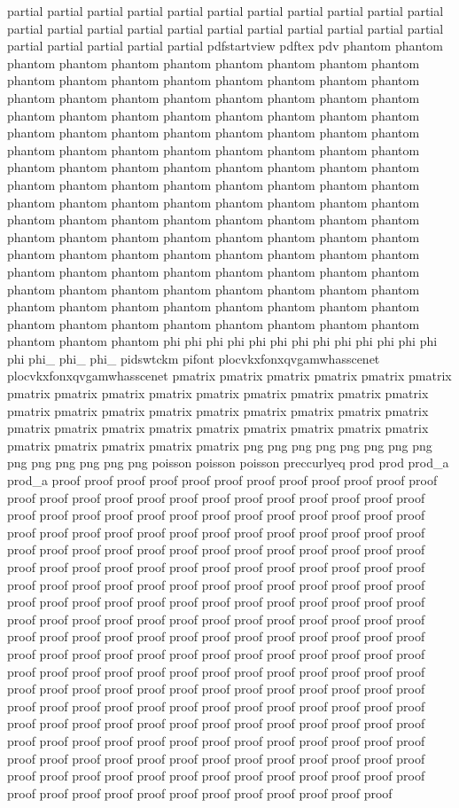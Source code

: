partial partial partial partial partial partial partial partial partial partial partial partial partial partial partial partial partial partial partial partial partial partial partial partial partial partial partial pdfstartview pdftex pdv phantom phantom phantom phantom phantom phantom phantom phantom phantom phantom phantom phantom phantom phantom phantom phantom phantom phantom phantom phantom phantom phantom phantom phantom phantom phantom phantom phantom phantom phantom phantom phantom phantom phantom phantom phantom phantom phantom phantom phantom phantom phantom phantom phantom phantom phantom phantom phantom phantom phantom phantom phantom phantom phantom phantom phantom phantom phantom phantom phantom phantom phantom phantom phantom phantom phantom phantom phantom phantom phantom phantom phantom phantom phantom phantom phantom phantom phantom phantom phantom phantom phantom phantom phantom phantom phantom phantom phantom phantom phantom phantom phantom phantom phantom phantom phantom phantom phantom phantom phantom phantom phantom phantom phantom phantom phantom phantom phantom phantom phantom phantom phantom phantom phantom phantom phantom phantom phantom phantom phantom phantom phantom phantom phantom phantom phantom phantom phantom phantom phantom phantom phantom phantom phi phi phi phi phi phi phi phi phi phi phi phi phi phi phi_ phi_ phi_ pidswtckm pifont plocvkxfonxqvgamwhasscenet plocvkxfonxqvgamwhasscenet pmatrix pmatrix pmatrix pmatrix pmatrix pmatrix pmatrix pmatrix pmatrix pmatrix pmatrix pmatrix pmatrix pmatrix pmatrix pmatrix pmatrix pmatrix pmatrix pmatrix pmatrix pmatrix pmatrix pmatrix pmatrix pmatrix pmatrix pmatrix pmatrix pmatrix pmatrix pmatrix pmatrix pmatrix pmatrix pmatrix pmatrix pmatrix png png png png png png png png png png png png png png poisson poisson poisson preccurlyeq prod prod prod_a prod_a proof proof proof proof proof proof proof proof proof proof proof proof proof proof proof proof proof proof proof proof proof proof proof proof proof proof proof proof proof proof proof proof proof proof proof proof proof proof proof proof proof proof proof proof proof proof proof proof proof proof proof proof proof proof proof proof proof proof proof proof proof proof proof proof proof proof proof proof proof proof proof proof proof proof proof proof proof proof proof proof proof proof proof proof proof proof proof proof proof proof proof proof proof proof proof proof proof proof proof proof proof proof proof proof proof proof proof proof proof proof proof proof proof proof proof proof proof proof proof proof proof proof proof proof proof proof proof proof proof proof proof proof proof proof proof proof proof proof proof proof proof proof proof proof proof proof proof proof proof proof proof proof proof proof proof proof proof proof proof proof proof proof proof proof proof proof proof proof proof proof proof proof proof proof proof proof proof proof proof proof proof proof proof proof proof proof proof proof proof proof proof proof proof proof proof proof proof proof proof proof proof proof proof proof proof proof proof proof proof proof proof proof proof proof proof proof proof proof proof proof proof proof proof proof proof proof proof proof proof proof proof proof proof proof proof proof proof proof proof proof proof proof proof proof proof 